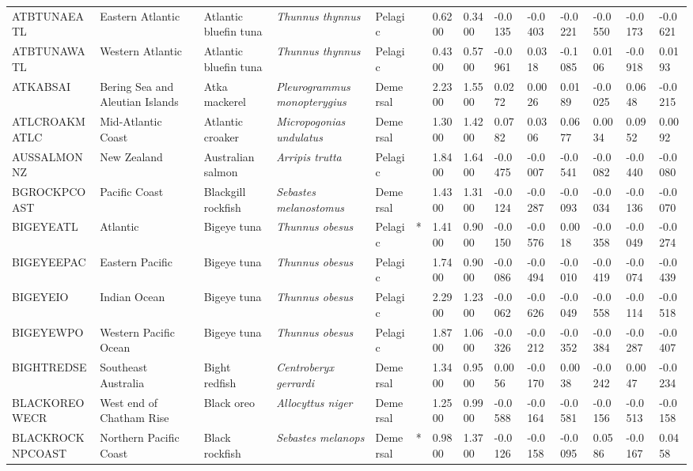 \begin{longtable}{p{2.8cm}p{2cm}p{1.7cm}p{1.7cm}p{1cm}p{0.3cm}p{1cm}p{1cm}p{1cm}p{1cm}p{1cm}p{1cm}p{1cm}p{1cm}}
  ATBTUNAEATL & Eastern Atlantic & Atlantic bluefin tuna & \textit{Thunnus thynnus} & Pelagic &   & 0.6200 & 0.3400 & -0.0135 & -0.0403 & -0.0221 & -0.0550 & -0.0173 & -0.0621 \\ 
  ATBTUNAWATL & Western Atlantic & Atlantic bluefin tuna & \textit{Thunnus thynnus} & Pelagic &   & 0.4300 & 0.5700 & -0.0961 & 0.0318 & -0.1085 & 0.0106 & -0.0918 & 0.0193 \\ 
  ATKABSAI & Bering Sea and Aleutian Islands & Atka mackerel & \textit{Pleurogrammus monopterygius} & Demersal &   & 2.2300 & 1.5500 & 0.0272 & 0.0026 & 0.0189 & -0.0025 & 0.0648 & -0.0215 \\ 
  ATLCROAKMATLC & Mid-Atlantic Coast & Atlantic croaker & \textit{Micropogonias undulatus} & Demersal &   & 1.3000 & 1.4200 & 0.0782 & 0.0306 & 0.0677 & 0.0034 & 0.0952 & 0.0092 \\ 
  AUSSALMONNZ & New Zealand & Australian salmon & \textit{Arripis trutta} & Pelagic &   & 1.8400 & 1.6400 & -0.0475 & -0.0007 & -0.0541 & -0.0082 & -0.0440 & -0.0080 \\ 
  BGROCKPCOAST & Pacific Coast & Blackgill rockfish & \textit{Sebastes melanostomus} & Demersal &   & 1.4300 & 1.3100 & -0.0124 & -0.0287 & -0.0093 & -0.0034 & -0.0136 & -0.0070 \\ 
  BIGEYEATL & Atlantic & Bigeye tuna & \textit{Thunnus obesus} & Pelagic & * & 1.4100 & 0.9000 & -0.0150 & -0.0576 & 0.0018 & -0.0358 & -0.0049 & -0.0274 \\ 
  BIGEYEEPAC & Eastern Pacific & Bigeye tuna & \textit{Thunnus obesus} & Pelagic &   & 1.7400 & 0.9000 & -0.0086 & -0.0494 & -0.0010 & -0.0419 & -0.0074 & -0.0439 \\ 
  BIGEYEIO & Indian Ocean & Bigeye tuna & \textit{Thunnus obesus} & Pelagic &   & 2.2900 & 1.2300 & -0.0062 & -0.0626 & -0.0049 & -0.0558 & -0.0114 & -0.0518 \\ 
  BIGEYEWPO & Western Pacific Ocean & Bigeye tuna & \textit{Thunnus obesus} & Pelagic &   & 1.8700 & 1.0600 & -0.0326 & -0.0212 & -0.0352 & -0.0384 & -0.0287 & -0.0407 \\ 
  BIGHTREDSE & Southeast Australia & Bight redfish & \textit{Centroberyx gerrardi} & Demersal &   & 1.3400 & 0.9500 & 0.0056 & -0.0170 & 0.0038 & -0.0242 & 0.0047 & -0.0234 \\ 
  BLACKOREOWECR & West end of Chatham Rise & Black oreo & \textit{Allocyttus niger} & Demersal &   & 1.2500 & 0.9900 & -0.0588 & -0.0164 & -0.0581 & -0.0156 & -0.0513 & -0.0158 \\ 
  BLACKROCKNPCOAST & Northern Pacific Coast & Black rockfish & \textit{Sebastes melanops} & Demersal & * & 0.9800 & 1.3700 & -0.0126 & -0.0158 & -0.0095 & 0.0586 & -0.0167 & 0.0458 \\ 

\end{longtable}
